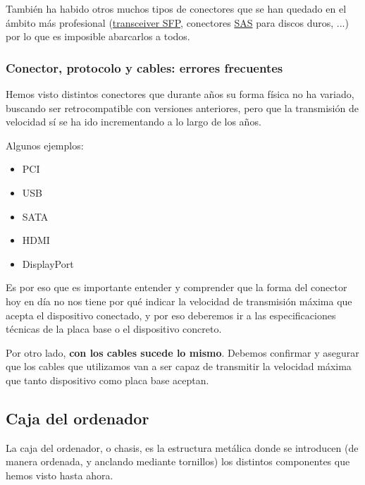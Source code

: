 También ha habido otros muchos tipos de conectores que se han quedado en el ámbito más profesional (\href{https://es.wikipedia.org/wiki/Transceptor_SFP}{transceiver SFP}, conectores \href{https://es.wikipedia.org/wiki/Serial_Attached_SCSI}{SAS} para discos duros, ...) por lo que es imposible abarcarlos a todos.


\subsubsection{Conector, protocolo y cables: errores frecuentes}

Hemos visto distintos conectores que durante años su forma física no ha variado, buscando ser retrocompatible con versiones anteriores, pero que la transmisión de velocidad sí se ha ido incrementando a lo largo de los años.

Algunos ejemplos:

\begin{itemize}
    \item PCI
    \item USB
    \item SATA
    \item HDMI
    \item DisplayPort
\end{itemize}

Es por eso que es importante entender y comprender que la forma del conector hoy en día no nos tiene por qué indicar la velocidad de transmisión máxima que acepta el dispositivo conectado, y por eso deberemos ir a las especificaciones técnicas de la placa base o el dispositivo concreto.

Por otro lado, \textbf{con los cables sucede lo mismo}. Debemos confirmar y asegurar que los cables que utilizamos van a ser capaz de transmitir la velocidad máxima que tanto dispositivo como placa base aceptan.


\vspace{10pt}

\subsection{Caja del ordenador}
La caja del ordenador, o chasis, es la estructura metálica donde se introducen (de manera ordenada, y anclando mediante tornillos) los distintos componentes que hemos visto hasta ahora.

